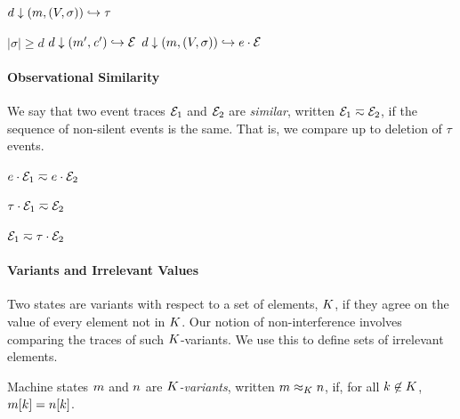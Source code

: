 \documentclass[10pt,conference]{ieeetran}%
\theoremstyle{definition}
\begin{document}
         {\(d \downarrow (m,(V,\sigma)) \hookrightarrow \tau\)}

                  {\(|\sigma| \geq d\)}
                  {\(d \downarrow (m',\mathit{c}') \hookrightarrow \mathcal{E}\)}
                  {\(d \downarrow (m,(V,\sigma)) \hookrightarrow e \cdot \mathcal{E}\)}

\paragraph*{Observational Similarity}

We say that two event traces $\mathcal{E}_1$ and $\mathcal{E}_2$ are {\em similar},
written \(\mathcal{E}_1 \eqsim \mathcal{E}_2\), if the sequence of non-silent events
is the same. That is, we compare up to deletion of \(\tau\) events.

\begin{minipage}{.4\columnwidth}
  \judgment{}{\(\obsT \eqsim \obsT\)}
\end{minipage}
\begin{minipage}{.4\columnwidth}
           {\(e \cdot \mathcal{E}_1 \eqsim e \cdot \mathcal{E}_2\)}
\end{minipage}

\begin{minipage}{.4\columnwidth}
           {\(\tau \cdot \mathcal{E}_1 \eqsim \mathcal{E}_2\)}
\end{minipage}
\begin{minipage}{.4\columnwidth}
           {\(\mathcal{E}_1 \eqsim \tau \cdot \mathcal{E}_2\)}
\end{minipage}

\paragraph*{Variants and Irrelevant Values}

Two states are variants with respect to a set of elements, \(K\),
if they agree on the value of every element not in \(K\). Our
notion of non-interference involves comparing the traces of such
\(K\)-variants. We use this to define sets of irrelevant elements.

 Machine states \(m\) and \(n\) are {\em \(K\)-variants},
written \(m \approx_K n\), if, for
all \(k \not \in K\), \(m[k] = n[k]\).
\end{document}
